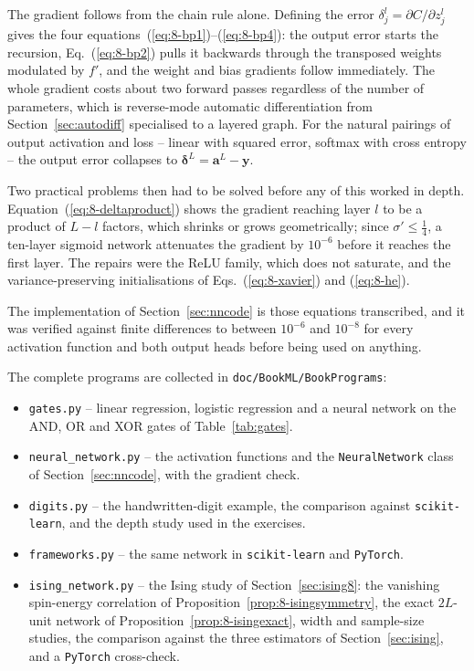 The gradient follows from the chain rule alone.  Defining the error
$\delta_j^{l}=\partial C/\partial z_j^{l}$ gives the four
equations~(\ref{eq:8-bp1})--(\ref{eq:8-bp4}): the output error starts the
recursion, Eq.~(\ref{eq:8-bp2}) pulls it backwards through the transposed
weights modulated by $f'$, and the weight and bias gradients follow
immediately.  The whole gradient costs about two forward passes regardless of
the number of parameters, which is reverse-mode automatic differentiation from
Section~\ref{sec:autodiff} specialised to a layered graph.  For the natural
pairings of output activation and loss -- linear with squared error, softmax
with cross entropy -- the output error collapses to
$\bm{\delta}^{L}=\bm{a}^{L}-\bm{y}$.

Two practical problems then had to be solved before any of this worked in
depth.  Equation~(\ref{eq:8-deltaproduct}) shows the gradient reaching layer
$l$ to be a product of $L-l$ factors, which shrinks or grows geometrically;
since $\sigma'\le\tfrac14$, a ten-layer sigmoid network attenuates the gradient
by $10^{-6}$ before it reaches the first layer.  The repairs were the ReLU
family, which does not saturate, and the variance-preserving initialisations of
Eqs.~(\ref{eq:8-xavier}) and (\ref{eq:8-he}).

The implementation of Section~\ref{sec:nncode} is those equations transcribed,
and it was verified against finite differences to between $10^{-6}$ and
$10^{-8}$ for every activation function and both output heads before being used
on anything.

The complete programs are collected in \texttt{doc/BookML/BookPrograms}:

\begin{itemize}
  \item \texttt{gates.py} -- linear regression, logistic regression and a
        neural network on the AND, OR and XOR gates of
        Table~\ref{tab:gates}.
  \item \texttt{neural\_network.py} -- the activation functions and the
        \texttt{NeuralNetwork} class of Section~\ref{sec:nncode}, with the
        gradient check.
  \item \texttt{digits.py} -- the handwritten-digit example, the comparison
        against \texttt{scikit-learn}, and the depth study used in the
        exercises.
  \item \texttt{frameworks.py} -- the same network in \texttt{scikit-learn} and
        \texttt{PyTorch}.
  \item \texttt{ising\_network.py} -- the Ising study of
        Section~\ref{sec:ising8}: the vanishing spin-energy correlation of
        Proposition~\ref{prop:8-isingsymmetry}, the exact $2L$-unit network
        of Proposition~\ref{prop:8-isingexact}, width and sample-size
        studies, the comparison against the three estimators of
        Section~\ref{sec:ising}, and a \texttt{PyTorch} cross-check.
\end{itemize}

